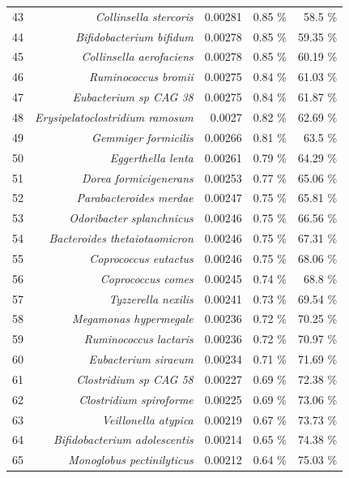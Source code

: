 \documentclass{article}
\begin{document}
\begin{table}[h]
\begin{centering}
\begin{tabular}{|r|r|r|r|r|}
      43 & \textit{Collinsella stercoris} & 0.00281 & 0.85 \% & 58.5 \% \\
      44 & \textit{Bifidobacterium bifidum} & 0.00278 & 0.85 \% & 59.35 \% \\
      45 & \textit{Collinsella aerofaciens} & 0.00278 & 0.85 \% & 60.19 \% \\
      46 & \textit{Ruminococcus bromii} & 0.00275 & 0.84 \% & 61.03 \% \\
      47 & \textit{Eubacterium sp CAG 38} & 0.00275 & 0.84 \% & 61.87 \% \\
      48 & \textit{Erysipelatoclostridium ramosum} & 0.0027 & 0.82 \% & 62.69 \% \\
      49 & \textit{Gemmiger formicilis} & 0.00266 & 0.81 \% & 63.5 \% \\
      50 & \textit{Eggerthella lenta} & 0.00261 & 0.79 \% & 64.29 \% \\
      51 & \textit{Dorea formicigenerans} & 0.00253 & 0.77 \% & 65.06 \% \\
      52 & \textit{Parabacteroides merdae} & 0.00247 & 0.75 \% & 65.81 \% \\
      53 & \textit{Odoribacter splanchnicus} & 0.00246 & 0.75 \% & 66.56 \% \\
      54 & \textit{Bacteroides thetaiotaomicron} & 0.00246 & 0.75 \% & 67.31 \% \\
      55 & \textit{Coprococcus eutactus} & 0.00246 & 0.75 \% & 68.06 \% \\
      56 & \textit{Coprococcus comes} & 0.00245 & 0.74 \% & 68.8 \% \\
      57 & \textit{Tyzzerella nexilis} & 0.00241 & 0.73 \% & 69.54 \% \\
      58 & \textit{Megamonas hypermegale} & 0.00236 & 0.72 \% & 70.25 \% \\
      59 & \textit{Ruminococcus lactaris} & 0.00236 & 0.72 \% & 70.97 \% \\
      60 & \textit{Eubacterium siraeum} & 0.00234 & 0.71 \% & 71.69 \% \\
      61 & \textit{Clostridium sp CAG 58} & 0.00227 & 0.69 \% & 72.38 \% \\
      62 & \textit{Clostridium spiroforme} & 0.00225 & 0.69 \% & 73.06 \% \\
      63 & \textit{Veillonella atypica} & 0.00219 & 0.67 \% & 73.73 \% \\
      64 & \textit{Bifidobacterium adolescentis} & 0.00214 & 0.65 \% & 74.38 \% \\
      65 & \textit{Monoglobus pectinilyticus} & 0.00212 & 0.64 \% & 75.03 \% \\

\end{tabular}
\end{centering}
\end{table}
\end{document}
